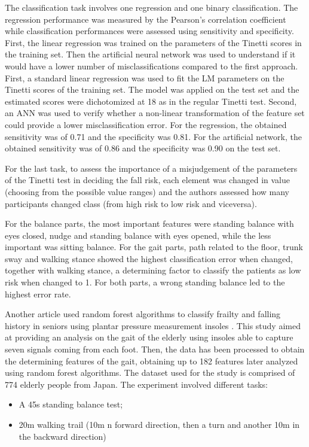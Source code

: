 The classification task involves one regression and one binary classification. The regression performance was measured by the Pearson's correlation coefficient while classification performances were assessed using sensitivity and specificity.
First, the linear regression was trained on the parameters of the Tinetti scores in the training set. Then the artificial neural network was used to understand if it would have a lower number of misclassifications compared to the first approach. 
First, a standard linear regression was used to fit the LM parameters
on the Tinetti scores of the training set. The model was applied on the
test set and the estimated scores were dichotomized at 18 as in the
regular Tinetti test.
Second, an ANN was used to verify whether a non-linear transformation of the feature set could provide a lower misclassification error.
For the regression, the obtained sensitivity was of 0.71 and the specificity was 0.81.
For the artificial network, the obtained sensitivity was of 0.86 and the specificity was 0.90 on the test set.

For the last task, to assess the importance of a misjudgement of the parameters of the Tinetti test in deciding the fall risk, each element was changed in value (choosing from the possible value ranges) and the authors assessed how many participants changed class (from high risk to low risk and viceversa).  

For the balance parts, the most important features were standing balance
with eyes closed, nudge and standing balance with eyes opened, while the less important was sitting balance.
For the gait parts, path related to the floor, trunk sway and walking stance showed the highest classification error when changed, together with walking stance, a determining factor to classify the patients as low risk when changed to 1.
For both parts, a wrong standing balance led to the highest error rate.

Another article used random forest algorithms to classify frailty and falling history in seniors using plantar pressure measurement insoles \cite{RandomForestInsoles}. This study aimed at providing an analysis on the gait of the elderly using insoles able to capture seven signals coming from each foot. Then, the data has been processed to obtain the determining features of the gait, obtaining up to 182 features later analyzed using random forest algorithms. 
The dataset used for the study is comprised of 774 elderly people from Japan. 
The experiment involved different tasks:
\begin{itemize}
    \item A 45s standing balance test;
    \item 20m walking trail (10m n forward direction, then a turn and another 10m in the backward direction)
\end{itemize}

